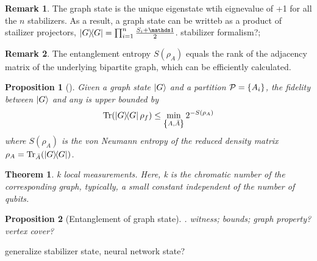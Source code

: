 \documentclass[
aps,
pra,
linenumbers,
floatfix,
]{revtex4-2}
\theoremstyle{plain}
\newtheorem{theorem}{Theorem}
\newtheorem{proposition}{Proposition}
\theoremstyle{definition}
\newtheorem{remark}{Remark}
\newcommand{\dm}{\rho}
\begin{document}
\begin{remark}
	The graph state is the unique eigenstate wtih eignevalue of +1 for all the $n$ stabilizers.
	As a result, a graph state can be writteb as a product of stailizer projectors, $\op{G}=\prod_{i=1}^n \frac{S_i +\identity}{2}$.
	stabilizer formalism?; 
\end{remark}
\begin{remark}
	The entanglement entropy $S( \dm_A )$ equals the rank of the adjacency matrix of the underlying bipartite graph, which can be efficiently calculated.
\end{remark}
\begin{proposition}[\cite{zhouDetectingMultipartiteEntanglement2019}]
	Given a graph state $\ket{G}$ and a partition $\mathcal{P}=\qty{A_i}$, the fidelity between $\ket{G}$ and any  is upper bounded by
	\begin{equation}
		\Tr(\op{G} \dm_f) \le \min_{\qty{A,\bar{A}}} 2^{-S(\dm_A)}
	\end{equation}
	where $S(\dm_A)$ is the von Neumann entropy of the reduced density matrix $\dm_A=\Tr_{\bar{A}}(\op{G})$.
\end{proposition}
\begin{theorem}
	k local measurements. Here, k is the chromatic number of the corresponding graph, typically, a small constant independent of the number of qubits.
\end{theorem}
\begin{proposition}[Entanglement of graph state]
	\cite{heinEntanglementGraphStates2006}.
	witness; bounds; graph property? vertex cover?
\end{proposition}
generalize \cite{zhangEfficientEntanglementGeneration2021}
stabilizer state, neural network state?
\end{document}
